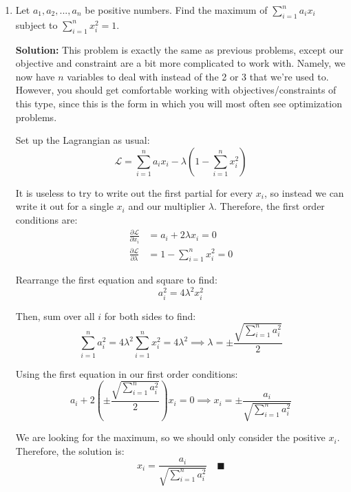 \documentclass[letterpaper, 11pt]{article}
\begin{document}
\begin{enumerate}
\item Let $a_1,a_2, ...,a_n$ be positive numbers. Find the maximum of $\sum_{i=1}^n a_i x_i$ subject to $ \sum_{i=1}^n x_i^2 = 1$.
\par \textbf{Solution:} This problem is exactly the same as previous problems, except our objective and constraint are a bit more complicated to work with. Namely, we now have $n$ variables to deal with instead of the 2 or 3 that we're used to. However, you should get comfortable working with objectives/constraints of this type, since this is the form in which you will most often see optimization problems.
\par Set up the Lagrangian as usual:
\[ \mathcal{L} = \sum_{i=1}^n a_i x_i - \lambda\left( 1 -  \sum_{i=1}^n x_i^2\right) \]

It is useless to try to write out the first partial for every $x_i$, so instead we can write it out for a single $x_i$ and our multiplier $\lambda$. Therefore, the first order conditions are:
\begin{align*}
\frac{ \partial \mathcal{L}}{\partial x_i} &= a_i + 2 \lambda x_i  = 0 \\
\frac{\partial \mathcal{L}}{\partial \lambda} &= 1 -  \sum_{i=1}^n x_i^2 = 0
\end{align*} 

Rearrange the first equation and square to find:
\[ a_i^2 = 4 \lambda^2 x_i^2 \]

Then, sum over all $i$ for both sides to find:
\[ \sum_{i=1}^n a_i^2 = 4 \lambda^2 \sum_{i=1}^n x_i^2  = 4 \lambda^2 \implies \lambda =  \pm \frac{ \sqrt{\sum_{i=1}^n a_i^2}}{2}  \]

Using the first equation in our first order conditions:
\[ a_i + 2 \left(\pm \frac{ \sqrt{\sum_{i=1}^n a_i^2}}{2} \right)  x_i  = 0 \implies x_i = \pm \frac{ a_i}{\sqrt{ \sum_{i=1}^n a_i^2}} \]

We are looking for the maximum, so we should only consider the positive $x_i$. Therefore, the solution is:
\[ x_i = \frac{ a_i}{\sqrt{ \sum_{i=1}^n a_i^2}} \quad\blacksquare \]
\end{enumerate}

\end{document}
